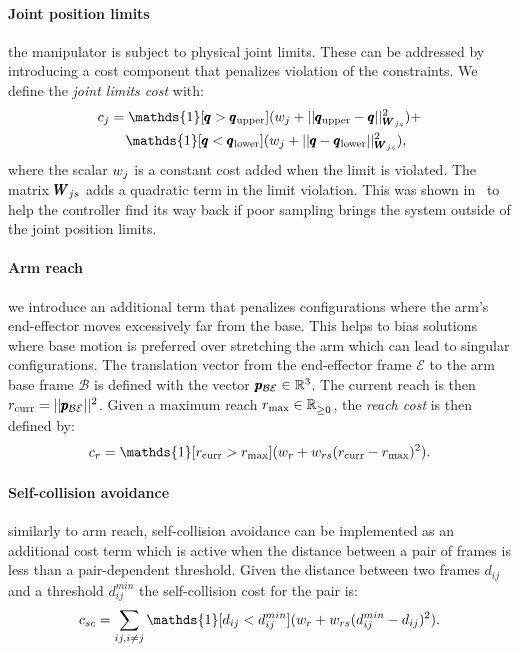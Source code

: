  \paragraph{Joint position limits} the manipulator is subject to physical joint limits. These can be addressed by introducing a cost component that penalizes violation of the constraints. We define the \textit{joint limits cost} with:
 \begin{align}
     &c_{j} = \mathds{1}[\configRobot > \upperLimits](\weightScalar{j} + ||\upperLimits - \configRobot||^2_{\weightMatrix{js}}) + \nonumber\\ 
     &\qquad\mathds{1}[\configRobot < \lowerLimits](\weightScalar{j} +  || \configRobot - \lowerLimits||^2_{\weightMatrix{js}}), 
 \end{align}
 where the scalar $w_{j}$ is a constant cost added when the limit is violated. The matrix $\pmb{W}_{js}$ adds a quadratic term in the limit violation. This was shown in~\cite{williams_information-theoretic_2018} to help the controller find its way back if poor sampling brings the system outside of the joint position limits.
 
 \paragraph{Arm reach} we introduce an additional term that penalizes configurations where the arm's end-effector moves excessively far from the base. This helps to bias solutions where base motion is preferred over stretching the arm which can lead to singular configurations. The translation vector from the end-effector frame $\mathcal{E}$ to the arm base frame $\mathcal{B}$ is defined with the vector $\pmb{p}_{\mathcal{B}\mathcal{E}} \in \mathbb{R}^{3}$. The current reach is then $r_{\text{curr}} = || \pmb{p}_{\mathcal{B}\mathcal{E}} ||^2$. Given a maximum reach $r_{\text{max}} \in \mathbb{R}^{}_{\geq 0}$, the \textit{reach cost} is then defined by:
 \begin{equation}
   c_r = \mathds{1}[r_{\text{curr}} > r_{\text{max}}] (\weightScalar{r} + \weightScalar{rs}(r_{\text{curr}} - r_{\text{max}})^2).    
 \end{equation}

 \paragraph{Self-collision avoidance} similarly to arm reach, self-collision avoidance can be implemented as an additional cost term which is active when the distance between a pair of frames is less than a pair-dependent threshold. Given the distance between two frames $d_{ij}$ and a threshold $d^{min}_{ij}$ the self-collision cost for the pair is:
 \begin{equation}
   c_{sc} = \sum_{ij, i \neq j} \mathds{1}[d_{ij} < d^{min}_{ij}] (\weightScalar{r} + \weightScalar{rs}(d^{min}_{ij} - d_{ij})^2).    
 \end{equation}
 
